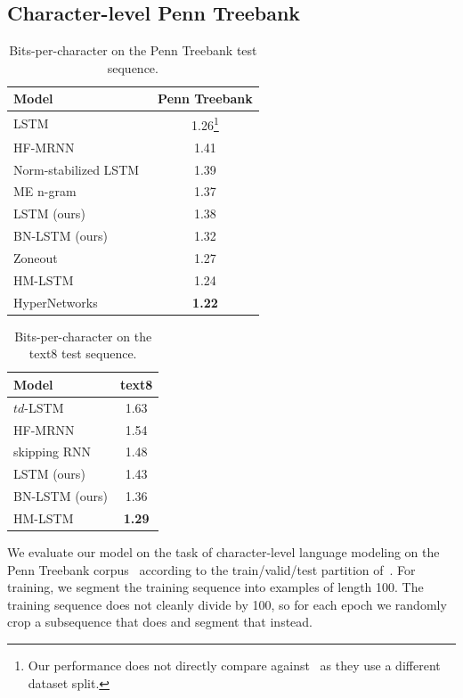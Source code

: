 \documentclass{article} %
\begin{document}
\subsection{Character-level Penn Treebank}
\begin{table}%
  \center
\begin{tabular}{@{}lc@{}}
  \toprule
  \bf Model & \bf Penn Treebank \\
  \midrule
  LSTM~\citep{graves2013generating} &  1.26\footnote{Our performance does not directly compare against~\citep{graves2013generating} as they use a different dataset split.}\\
  \midrule
  HF-MRNN~\citep{mikolov2012subword} & 1.41 \\
  Norm-stabilized LSTM~\citep{krueger} & 1.39 \\
  ME n-gram~\citep{mikolov2012subword} & 1.37 \\
  \midrule
  LSTM (ours) & 1.38 \\
  BN-LSTM (ours) & 1.32 \\
  \midrule
  Zoneout~\citep{krueger2016zoneout} & 1.27 \\
  HM-LSTM~\citep{chung2016hierarchical} & 1.24 \\
  HyperNetworks~\citep{ha2016hypernetworks} & \textbf{1.22} \\
  \bottomrule
\end{tabular}
\caption{Bits-per-character on the Penn Treebank test sequence.}
\label{tab:ptb_test}
\end{table}
\begin{table}%
  \center
  \begin{tabular}{@{}lc@{}}
  \toprule
  \bf Model & \bf text8 \\
  \midrule
  $td$-LSTM~\citep{zhang2016architectural} & 1.63 \\
  HF-MRNN~\citep{mikolov2012subword} & 1.54 \\
  skipping RNN~\citep{pachitariu2013regularization} & 1.48 \\
  \midrule
  LSTM (ours) &  1.43 \\
  BN-LSTM (ours) & 1.36 \\
  \midrule
  HM-LSTM~\citep{chung2016hierarchical} & \textbf{1.29} \\
  \bottomrule
\end{tabular}
\caption{Bits-per-character on the text8 test sequence.}
\label{tab:text8_test}
\end{table}
We evaluate our model on the task of character-level language modeling on the Penn Treebank corpus~\citep{penntreebank}
according to the train/valid/test partition of~\citet{mikolov2012subword}.
For training, we segment the training sequence into examples of length 100.
The training sequence does not cleanly divide by 100, so for each epoch we randomly crop a subsequence that does and segment that instead.
\end{document}
